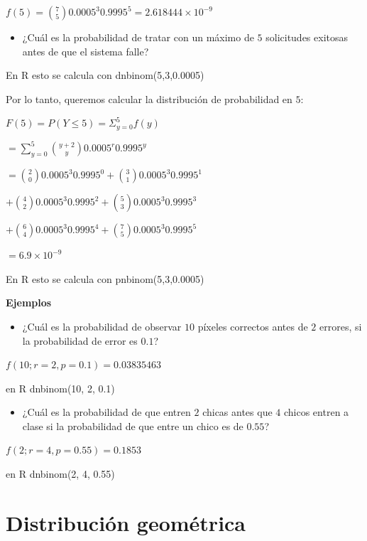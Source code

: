 \documentclass[
]{book}
\providecommand{\tightlist}{%
  \setlength{\itemsep}{0pt}\setlength{\parskip}{0pt}}
\begin{document}
\(f(5)=\binom {7} 5 0.0005^3 0.9995^5=2.618444 \times 10^{-9}\)

\begin{itemize}
\tightlist
\item
  ¿Cuál es la probabilidad de tratar con un máximo de \(5\) solicitudes exitosas antes de que el sistema falle?
\end{itemize}

En R esto se calcula con dnbinom(5,3,0.0005)

Por lo tanto, queremos calcular la distribución de probabilidad en \(5\):

\(F(5)=P(Y\leq 5)=\Sigma_{y=0}^5 f(y)\)

\(=\sum_{y=0}^5\binom {y+2} y 0.0005^r0.9995^y\)

\(=\binom{2} 0 0.0005^3 0.9995^0 +\binom{3} 1 0.0005^3 0.9995^1\)

\(+\binom {4} 2 0.0005^3 0.9995^2 +\binom {5} 3 0.0005^3 0.9995^3\)

\(+\binom {6} 4 0.0005^3 0.9995^4 +\binom {7} 5 0.0005^3 0.9995^5\)

\(= 6.9\times 10^{-9}\)

En R esto se calcula con pnbinom(5,3,0.0005)

\textbf{Ejemplos}

\begin{itemize}
\tightlist
\item
  ¿Cuál es la probabilidad de observar \(10\) píxeles correctos antes de \(2\) errores, si la probabilidad de error es \(0.1\)?
\end{itemize}

\(f(10; r=2, p=0.1)=0.03835463\)

en R dnbinom(10, 2, 0.1)

\begin{itemize}
\tightlist
\item
  ¿Cuál es la probabilidad de que entren \(2\) chicas antes que \(4\) chicos entren a clase si la probabilidad de que entre un chico es de \(0.55\)?
\end{itemize}

\(f(2; r=4, p=0.55)=0.1853\)

en R dnbinom(2, 4, 0.55)

\hypertarget{distribuciuxf3n-geomuxe9trica}{%
\section{Distribución geométrica}\label{distribuciuxf3n-geomuxe9trica}}
\end{document}
